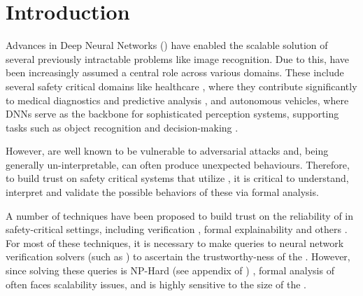 
\section{Introduction}

Advances in Deep Neural Networks (\dnn) have enabled the scalable solution
of several previously intractable problems like image recognition. Due to this, \dnn have been increasingly assumed a central role
across various domains. These include several safety critical domains like
healthcare \cite{b1}, where they contribute significantly to medical diagnostics
and predictive analysis \cite{b2}, and autonomous vehicles, where DNNs serve as
the backbone for sophisticated perception systems, supporting tasks such as
object recognition and decision-making \cite{b3}. 

However, \dnn are well known to be vulnerable to adversarial attacks  and, being generally un-interpretable, can often produce unexpected
behaviours. Therefore, to build trust on safety critical systems that utilize
\dnn, it is  critical to understand, interpret and validate
the possible behaviors of these \dnn via formal analysis.  

A number of techniques have been proposed to build trust on the reliability
of \dnn in safety-critical settings, including verification \cite{reluplex,
deeppoly} , formal explainability \cite{overview-fxai,
minimal-image-fxai} and others . For most of these
techniques, it is necessary to make queries to neural network verification
solvers (such as \cite{reluplex}) to ascertain the trustworthy-ness of the \dnn.
 However, since solving these queries is NP-Hard (see appendix of
\cite{reluplex}) , formal analysis of \dnn
often faces scalability issues, and is highly sensitive to the size of the \dnn.

